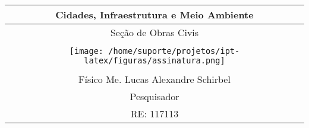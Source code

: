 \begin{table}[b]
  \begin{adjustwidth}{0pt}{-9cm} %
  \centering
  \setlength{\arrayrulewidth}{0.9pt} %
  \begin{tabular}{|c|}
    \hline
    Cidades, Infraestrutura e Meio Ambiente \\
    \hline
    Seção de Obras Civis \\
    \hline \\[1.0pt]
    \texttt{[image: /home/suporte/projetos/ipt-latex/figuras/assinatura.png]} \\[5.0pt]
    \hline \\[-25.0pt]
    Físico Me. Lucas Alexandre Schirbel \\[-7.0pt]
    Pesquisador \\[-7.0pt]
    RE: 117113 \\[0.0pt]
    \hline
  \end{tabular}
  \end{adjustwidth}
\end{table}
